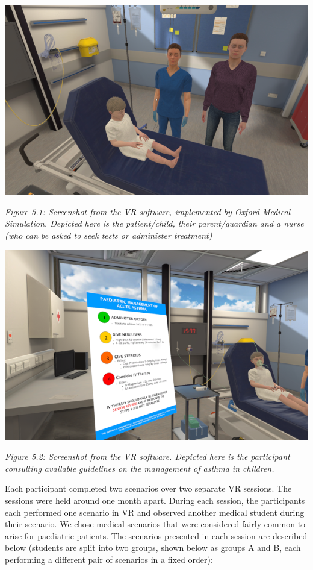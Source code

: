 \documentclass[a4paper, nobind]{templates/ociamthesis}
\begin{document}
\newpage

\begin{center}\includegraphics[width=1\linewidth]{./assets/VRScreenshot1} \end{center}

\emph{Figure 5.1: Screenshot from the VR software, implemented by Oxford Medical Simulation. Depicted here is the patient/child, their parent/guardian and a nurse (who can be asked to seek tests or administer treatment)}\\

\begin{center}\includegraphics[width=1\linewidth]{./assets/VRScreenshot2} \end{center}

\emph{Figure 5.2: Screenshot from the VR software. Depicted here is the participant consulting available guidelines on the management of asthma in children.}

\hfill\break
Each participant completed two scenarios over two separate VR sessions. The sessions were held around one month apart. During each session, the participants each performed one scenario in VR and observed another medical student during their scenario. We chose medical scenarios that were considered fairly common to arise for paediatric patients. The scenarios presented in each session are described below (students are split into two groups, shown below as groups A and B, each performing a different pair of scenarios in a fixed order):
\end{document}
